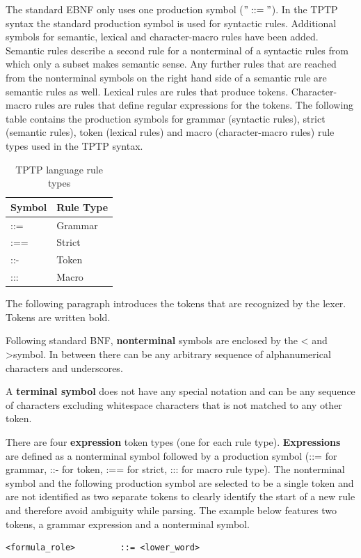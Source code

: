 The standard \ac{EBNF} only uses one production symbol ($"::="$).
In the \ac{TPTP} syntax the standard production symbol is used for syntactic rules.
Additional symbols for semantic, lexical and character-macro rules have been added. Semantic rules describe a second rule for a nonterminal of a syntactic rules from which only a subset makes semantic sense. Any further rules that are reached from the nonterminal symbols on the right hand side of a semantic rule are semantic rules as well. Lexical rules are rules that produce tokens. Character-macro rules are rules that define regular expressions for the tokens.
The following table contains the production symbols for grammar (syntactic rules), strict (semantic rules), token (lexical rules) and macro (character-macro rules) rule types used in the \ac{TPTP} syntax.

\begin{table}[H]
\centering
\renewcommand{\arraystretch}{1}
\caption{\ac{TPTP} language rule types \cite{VS06}}
\begin{tabular}{ll}
\textbf{Symbol} & \textbf{Rule Type}\\\hline
::= & Grammar\\
:== & Strict\\
::- & Token\\
::: & Macro\\
\end{tabular}
\label{tbl:ConceptTPTPProductionSymbols}
\end{table}

The following paragraph introduces the tokens that are recognized by the lexer. Tokens are written bold.

Following standard \ac{BNF}, \textbf{nonterminal} symbols are enclosed by the \textless\; and \textgreater \;symbol.
In between there can be any arbitrary sequence of alphanumerical characters and underscores.

A \textbf{terminal symbol} does not have any special notation and can be any sequence of characters excluding whitespace characters that is not matched to any other token.

There are four \textbf{expression} token types (one for each rule type).
\textbf{Expressions} are defined as a nonterminal symbol followed by a production symbol (::= for grammar, ::- for token, :== for strict, ::: for macro rule type).
The nonterminal symbol and the following production symbol are selected to be a single token and are not identified as two separate tokens to clearly identify the start of a new rule and therefore avoid ambiguity while parsing.
The example below features two tokens, a grammar expression and a nonterminal symbol.
\begin{verbatim}
<formula_role>         ::= <lower_word>
\end{verbatim}

